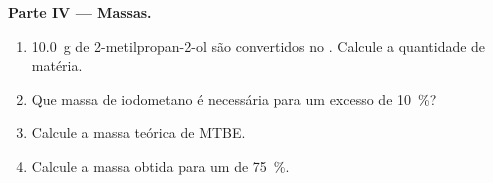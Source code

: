 \begin{problem}
\medskip
\noindent\textbf{Parte IV --- Massas.}
\begin{enumerate}[resume]
  \item \qty{10.0}{g} de 2-metilpropan-2-ol são convertidos no
        . Calcule a quantidade de matéria.
  \item Que massa de iodometano é necessária para um excesso de \qty{10}{\percent}?
  \item Calcule a massa teórica de MTBE.
  \item Calcule a massa obtida para um  de \qty{75}{\percent}.
\end{enumerate}
\end{problem}
